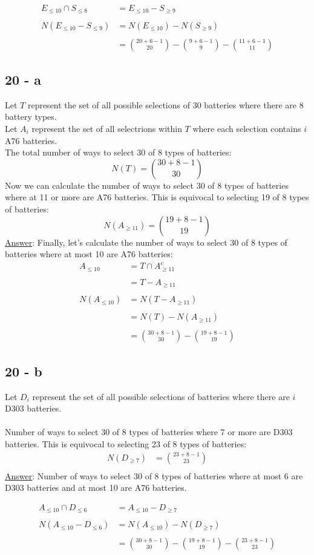 \documentclass[12pt]{article}
\begin{document}
\begin{align*}
  E_{\leq10} \cap S_{\leq8} &= E_{\leq10} - S_{\geq9}  \\
  \\
  N(E_{\leq10} - S_{\leq9}) &= N(E_{\leq10}) - N(S_{\geq9}) \\
  \\
  &= \binom{20+6-1}{20} - \binom{9+6-1}{9} - \binom{11+6-1}{11}
\end{align*}
\subsection*{20 - a}
Let $T$ represent the set of all possible selections of 30 batteries where there are 8 battery types. \\
Let $A_i$ represent the set of all selectrions within $T$ where each selection contains $i$ A76 batteries. \\
The total number of ways to select 30 of 8 types of batteries:
$$N(T) = \binom{30+8-1}{30}$$
Now we can calculate the number of ways to select 30 of 8 types of batteries where at 11 or more are A76 batteries.
This is equivocal to selecting 19 of 8 types of batteries:
$$N(A_{\geq11}) = \binom{19+8-1}{19}$$
\underline{Answer}: Finally, let's calculate the number of ways to select 30 of 8 types of batteries where at most 10 are A76 batteries:
\begin{align*}
  A_{\leq10} &= T \cap A_{\geq11}^c \\
  \\ 
  &= T - A_{\geq11} \\
  \\
  N(A_{\leq10}) &= N(T - A_{\geq11}) \\
  \\
  &= N(T) - N(A_{\geq11})\\
  \\
  &= \binom{30+8-1}{30} - \binom{19+8-1}{19}
\end{align*}
\subsection*{20 - b}
Let $D_i$ represent the set of all possible selections of batteries where there are $i$ D303 batteries.
\\ \\
Number of ways to select 30 of 8 types of batteries where 7 or more are D303 batteries.
This is equivocal to selecting 23 of 8 types of batteries: \\
\begin{align*}
  N(D_{\geq7}) &= \binom{23+8-1}{23} \\
\end{align*}
\underline{Answer}: Number of ways to select 30 of 8 types of batteries where at most 6 are D303 batteries and at most 10 are A76 batteries.

\begin{align*}
  A_{\leq10} \cap D_{\leq6} &= A_{\leq10} - D_{\geq7}  \\
  \\
  N(A_{\leq10} - D_{\leq6}) &= N(A_{\leq10}) - N(D_{\geq7}) \\
  \\
  &= \binom{30+8-1}{30} - \binom{19+8-1}{19} - \binom{23+8-1}{23}
\end{align*}
\end{document}
